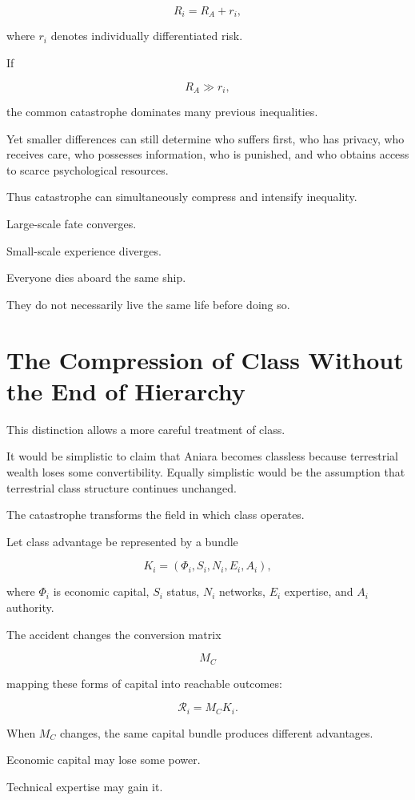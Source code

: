 \documentclass[11pt,oneside]{book}
\theoremstyle{definition}
\theoremstyle{remark}
\newcommand{\R}{\mathcal{R}}
\begin{document}
\[
R_i
=
R_A+r_i,
\]

where \(r_i\) denotes individually differentiated risk.

If

\[
R_A\gg r_i,
\]

the common catastrophe dominates many previous inequalities.

Yet smaller differences can still determine who suffers first, who has privacy, who receives care, who possesses information, who is punished, and who obtains access to scarce psychological resources.

Thus catastrophe can simultaneously compress and intensify inequality.

Large-scale fate converges.

Small-scale experience diverges.

Everyone dies aboard the same ship.

They do not necessarily live the same life before doing so.

\section{The Compression of Class Without the End of Hierarchy}

This distinction allows a more careful treatment of class.

It would be simplistic to claim that Aniara becomes classless because terrestrial wealth loses some convertibility. Equally simplistic would be the assumption that terrestrial class structure continues unchanged.

The catastrophe transforms the field in which class operates.

Let class advantage be represented by a bundle

\[
K_i
=
(\Phi_i,S_i,N_i,E_i,A_i),
\]

where \(\Phi_i\) is economic capital, \(S_i\) status, \(N_i\) networks, \(E_i\) expertise, and \(A_i\) authority.

The accident changes the conversion matrix

\[
M_C
\]

mapping these forms of capital into reachable outcomes:

\[
\R_i
=
M_CK_i.
\]

When \(M_C\) changes, the same capital bundle produces different advantages.

Economic capital may lose some power.

Technical expertise may gain it.
\end{document}
